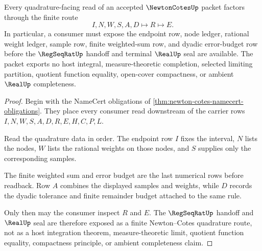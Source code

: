 \begin{theorem}
\label{thm:newton-cotes-regseqrat-quadrature-handoff}
Every quadrature-facing read of an accepted $\NewtonCotesUp$ packet factors through the finite route
$$
I,N,W,S,A,D \longmapsto R \longmapsto E .
$$
In particular, a consumer must expose the endpoint row, node ledger, rational weight ledger, sample row, finite weighted-sum row, and dyadic error-budget row before the $\RegSeqRatUp$ handoff and terminal $\RealUp$ seal are available. The packet exports no host integral, measure-theoretic completion, selected limiting partition, quotient function equality, open-cover compactness, or ambient $\RealUp$ completeness.
\end{theorem}
\begin{proof}
Begin with the NameCert obligations of \autoref{thm:newton-cotes-namecert-obligations}. They place every consumer read downstream of the carrier rows $I,N,W,S,A,D,R,E,H,C,P,L$.

Read the quadrature data in order. The endpoint row $I$ fixes the interval, $N$ lists the nodes, $W$ lists the rational weights on those nodes, and $S$ supplies only the corresponding samples.

The finite weighted sum and error budget are the last numerical rows before readback. Row $A$ combines the displayed samples and weights, while $D$ records the dyadic tolerance and finite remainder budget attached to the same rule.

Only then may the consumer inspect $R$ and $E$. The $\RegSeqRatUp$ handoff and $\RealUp$ seal are therefore exposed as a finite Newton--Cotes quadrature route, not as a host integration theorem, measure-theoretic limit, quotient function equality, compactness principle, or ambient completeness claim.
\end{proof}



